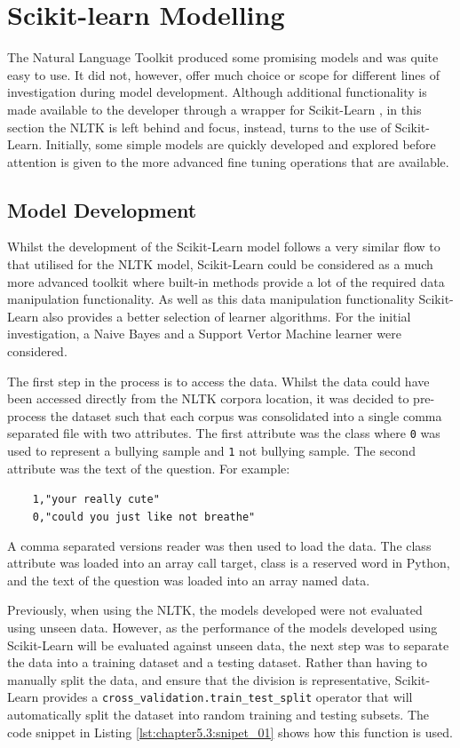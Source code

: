 \section{Scikit-learn Modelling}
\label{subsection:scikit-learn}

The Natural Language Toolkit produced some promising models and was quite easy to use. It did not, however, offer much choice or scope for different lines of investigation during model development. Although additional functionality is made available to the developer through a wrapper for Scikit-Learn \cite{scikit-learn}, in this section the NLTK is left behind and focus, instead, turns to the use of Scikit-Learn. Initially, some simple models are quickly developed and explored before attention is given to the more advanced fine tuning operations that are available.

\subsection{Model Development}
Whilst the development of the Scikit-Learn model follows a very similar flow to that utilised for the NLTK model, Scikit-Learn could be considered as a much more advanced toolkit where built-in methods provide a lot of the required data manipulation functionality. As well as this data manipulation functionality Scikit-Learn also provides a better selection of learner algorithms. For the initial investigation, a Naive Bayes and a Support Vertor Machine learner were considered.

The first step in the process is to access the data. Whilst the data could have been accessed directly from the NLTK corpora location, it was decided to pre-process the dataset such that each corpus was consolidated into a single comma separated file with two attributes. The first attribute was the class where \verb|0| was used to represent a bullying sample and \verb|1| not bullying sample. The second attribute was the text of the question. For example:

\verb|    1,"your really cute"| \\
\verb|    0,"could you just like not breathe"|

A comma separated versions reader was then used to load the data. The class attribute was loaded into an array call target, class is a reserved word in Python, and the text of the question was loaded into an array named data.

Previously, when using the NLTK, the models developed were not evaluated using unseen data. However, as the performance of the models developed using Scikit-Learn will be evaluated against unseen data, the next step was to separate the data into a training dataset and a testing dataset. Rather than having to manually split the data, and ensure that the division is representative, Scikit-Learn provides a \verb|cross_validation.train_test_split| operator that will automatically split the dataset into random training and testing subsets. The code snippet in Listing \ref{lst:chapter5.3:snipet_01} shows how this function is used.

